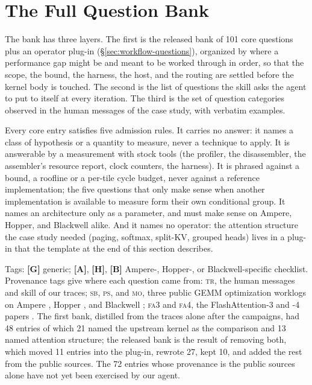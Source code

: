 
\section{The Full Question Bank}
\label{app:questions}

The bank has three layers. The first is the released bank of 101 core questions plus an operator
plug-in (\S\ref{sec:workflow-questions}), organized by where a performance gap might be and meant
to be worked through in order, so that the scope, the bound, the harness, the host, and the routing
are settled before the kernel body is touched. The second is the list of questions the skill asks the
agent to put to itself at every iteration. The third is the set of question categories observed in
the human messages of the case study, with verbatim examples.

Every core entry satisfies five admission rules. It carries no answer: it names a class of
hypothesis or a quantity to measure, never a technique to apply. It is answerable by a measurement
with stock tools (the profiler, the disassembler, the assembler's resource report, clock counters,
the harness). It is phrased against a bound, a roofline or a per-tile cycle budget, never against a
reference implementation; the five questions that only make sense when another implementation is
available to measure form their own conditional group. It names an architecture only as a parameter, and must make sense
on Ampere, Hopper, and Blackwell alike. And it names no operator: the attention structure the case
study needed (paging, softmax, split-KV, grouped heads) lives in a plug-in that the template at the
end of this section describes.

Tags: \textbf{[G]} generic; \textbf{[A]}, \textbf{[H]}, \textbf{[B]} Ampere-, Hopper-, or
Blackwell-specific checklist. Provenance tags give where each question came from: \textsc{tr}, the
human messages and skill of our traces; \textsc{sb}, \textsc{ps}, and \textsc{mo}, three public
GEMM optimization worklogs on Ampere \cite{boehm2022cudammm}, Hopper \cite{shankhdhar2024h100}, and
Blackwell \cite{modular2025blackwell}; \textsc{fa3} and \textsc{fa4}, the FlashAttention-3 and -4
papers \cite{shah2024flashattention3,zadouri2026flashattention4}. The first bank, distilled from the
traces alone after the campaigns, had 48 entries of which 21 named the upstream kernel as the
comparison and 13 named attention structure; the released bank is the result of removing both, which
moved 11 entries into the plug-in, rewrote 27, kept 10, and added the rest from the public sources.
The 72 entries whose provenance is the public sources alone have not yet been exercised by our agent.

